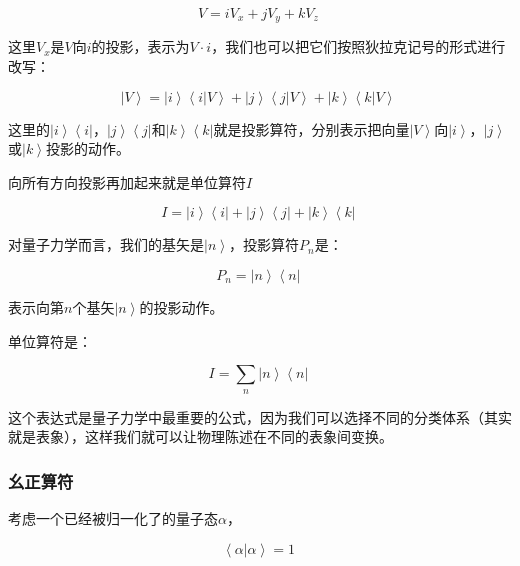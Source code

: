 \begin{equation}
V = i V_x + j V_y + k V_z~
\end{equation}

这里$V_x$是$V$向$i$的投影，表示为$V \cdot i$，我们也可以把它们按照狄拉克记号的形式进行改写：

\begin{equation}
\left| V \right\rangle =\left| i \right\rangle \left\langle i | V \right\rangle + \left| j \right\rangle \left\langle j | V \right\rangle + \left| k \right\rangle \left\langle k | V \right\rangle~
\end{equation}

这里的$\left| i \right\rangle \left\langle i \right|$，$\left| j \right\rangle \left\langle j \right|$和$\left| k \right\rangle \left\langle k \right|$就是投影算符，分别表示把向量$\left| V \right\rangle $向$\left| i \right\rangle $，$\left| j \right\rangle $或$\left| k \right\rangle $投影的动作。

向所有方向投影再加起来就是单位算符$I$

\begin{equation}
I = \left| i \right\rangle \left\langle i \right| + \left| j \right\rangle \left\langle j \right| + \left| k \right\rangle \left\langle k \right|~
\end{equation}

对量子力学而言，我们的基矢是$\left| n \right\rangle $，投影算符$P_n$是：

\begin{equation}
P_n = \left| n \right\rangle \left\langle n \right|~
\end{equation}

表示向第$n$个基矢$\left| n \right\rangle$的投影动作。

单位算符是：

\begin{equation}
I = \sum\limits_n \left| n \right\rangle \left\langle n \right|~
\end{equation}

这个表达式是量子力学中最重要的公式，因为我们可以选择不同的分类体系（其实就是表象），这样我们就可以让物理陈述在不同的表象间变换。

\subsubsection{幺正算符}

考虑一个已经被归一化了的量子态$\alpha$，

\begin{equation}
\left\langle \alpha | \alpha \right\rangle = 1~
\end{equation}

